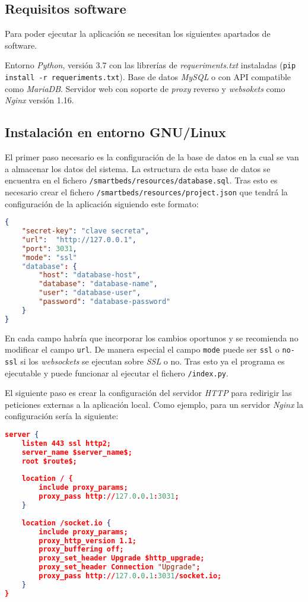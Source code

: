 \subsection{Requisitos software}

Para poder ejecutar la aplicación se necesitan los siguientes apartados de software.

Entorno \textit{Python}, versión 3.7 con las librerías de \textit{requeriments.txt} instaladas (\texttt{pip install -r requeriments.txt}).
Base de datos \textit{MySQL} o con API compatible como \textit{MariaDB}. Servidor web con soporte de \textit{proxy} reverso y \textit{websokets} como \textit{Nginx} versión 1.16.

\subsection{Instalación en entorno GNU/Linux}\label{sec:instalacion}

El primer paso necesario es la configuración de la base de datos en la cual se van a almacenar los datos del sistema. La estructura de esta base de datos se encuentra en el fichero \texttt{/smartbeds/resources/database.sql}. Tras esto es necesario crear el fichero \texttt{/smartbeds/resources/project.json} que tendrá la configuración de la aplicación siguiendo este formato:

\begin{lstlisting}[language=JSON]
{
	"secret-key": "clave secreta",
	"url":  "http://127.0.0.1",
	"port": 3031,
	"mode": "ssl"
	"database": {
		"host": "database-host",
		"database": "database-name",
		"user": "database-user",
		"password": "database-password"
	}
}
\end{lstlisting}

En cada campo habría que incorporar los cambios oportunos y se recomienda no modificar el campo \texttt{url}. De manera especial el campo \texttt{mode} puede ser \texttt{ssl} o \texttt{no-ssl} si los \textit{websockets} se ejecutan sobre \textit{SSL} o no. Tras esto ya el programa es ejecutable y puede funcionar al ejecutar el fichero \texttt{/index.py}.

El siguiente paso es crear la configuración del servidor \textit{HTTP} para redirigir las peticiones externas a la aplicación local. Como ejemplo, para un servidor \textit{Nginx} la configuración sería la siguiente:

\begin{lstlisting}[language=JSON]
server {
	listen 443 ssl http2;
	server_name $server_name$;
	root $route$;
	
	location / {
		include proxy_params;
		proxy_pass http://127.0.0.1:3031;
	}
	
	location /socket.io {
		include proxy_params;
		proxy_http_version 1.1;
		proxy_buffering off;
		proxy_set_header Upgrade $http_upgrade;
		proxy_set_header Connection "Upgrade";
		proxy_pass http://127.0.0.1:3031/socket.io;
	}
}
\end{lstlisting}

